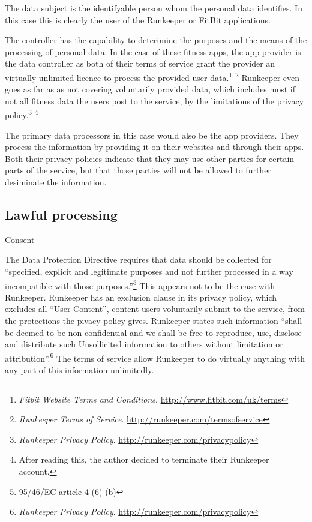 \documentclass{article}
\begin{document}
The data subject is the identifyable person whom the personal data identifies.
In this case this is clearly the user of the Runkeeper or FitBit applications.

The controller has the capability to deterimine the purposes and the means of the processing of personal data.
In the case of these fitness apps, the app provider is the data controller as both of their terms of service grant the provider an virtually unlimited licence to process the provided user data.\footnote{\emph{Fitbit Website Terms and Conditions}. \url{http://www.fitbit.com/uk/terms}} \footnote{\emph{Runkeeper Terms of Service}. \url{http://runkeeper.com/termsofservice}}
Runkeeper even goes as far as as not covering voluntarily provided data, which includes most if not all fitness data the users post to the service, by the limitations of the privacy policy.\footnote{\emph{Runkeeper Privacy Policy}. \url{http://runkeeper.com/privacypolicy}} \footnote{After reading this, the author decided to terminate their Runkeeper account.}

The primary data processors in this case would also be the app providers.
They process the information by providing it on their websites and through their apps.
Both their privacy policies indicate that they may use other parties for certain parts of the service, but that those parties will not be allowed to further desiminate the information.

\subsection{Lawful processing}

Consent

The Data Protection Directive requires that data should be collected for ``specified, explicit and legitimate purposes and not further processed in a way incompatible with those purposes.''\footnote{95/46/EC article 4 (6) (b)}
This appears not to be the case with Runkeeper.
Runkeeper has an exclusion clause in its privacy policy, which excludes all ``User Content'', content users voluntarily submit to the service, from the protections the pivacy policy gives.
Runkeeper states such information ``shall be deemed to be non-confidential and we shall be free to reproduce, use, disclose and distribute such Unsollicited information to others without limitation or attribution''.\footnote{\emph{Runkeeper Privacy Policy}. \url{http://runkeeper.com/privacypolicy}}
The terms of service allow Runkeeper to do virtually anything with any part of this information unlimitedly.
\end{document}
